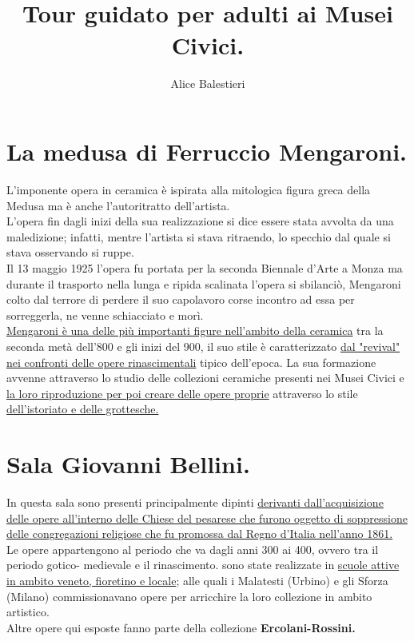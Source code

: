 \documentclass[12pt,a4paper]{article}
\begin{document}
	
	\title{\textbf{\\Tour guidato per adulti ai Musei Civici.}}
	\author{Alice Balestieri}
	\date{}
	
	\maketitle
	\newpage
	
	\tableofcontents
	\newpage
	
	\section{La medusa di Ferruccio Mengaroni.}
	L'imponente opera in ceramica è ispirata alla mitologica figura greca della Medusa ma è anche l’autoritratto dell'artista.\\
	L'opera fin dagli inizi della sua realizzazione si dice essere stata avvolta da una maledizione; infatti, mentre l'artista si stava ritraendo, lo specchio dal quale si stava osservando si ruppe.\\
	Il 13 maggio 1925 l'opera fu portata per la seconda Biennale d'Arte a Monza ma durante il trasporto nella lunga e ripida scalinata l'opera si sbilanciò, Mengaroni colto dal terrore di perdere il suo capolavoro corse incontro ad essa per sorreggerla, ne venne schiacciato e morì.\\
	\underline{Mengaroni è una delle più importanti figure nell'ambito della ceramica} tra la seconda metà dell’800 e gli inizi del 900, il suo stile è caratterizzato \underline{dal "revival" nei confronti delle opere rinascimentali} tipico dell'epoca. La sua formazione avvenne attraverso lo studio delle collezioni ceramiche presenti nei Musei Civici e \underline{la loro riproduzione per poi creare delle opere proprie} attraverso lo stile \underline{dell'istoriato e delle grottesche.}
	
	\section{Sala Giovanni Bellini.}
	In questa sala sono presenti principalmente dipinti \underline{derivanti dall'acquisizione delle opere all'interno delle Chiese del pesarese che furono oggetto di soppressione delle congregazioni religiose che fu promossa dal Regno d'Italia nell'anno 1861.}\\
	Le opere appartengono al periodo che va dagli anni  300 ai 400, ovvero tra il periodo gotico- medievale e il rinascimento. sono state realizzate in \underline{scuole attive in ambito veneto, fioretino e locale}; alle quali i Malatesti (Urbino) e gli Sforza (Milano) commissionavano opere per arricchire la loro collezione in ambito artistico.\\
	Altre opere qui esposte fanno parte della collezione \textbf{Ercolani-Rossini.}
	
\end{document}

